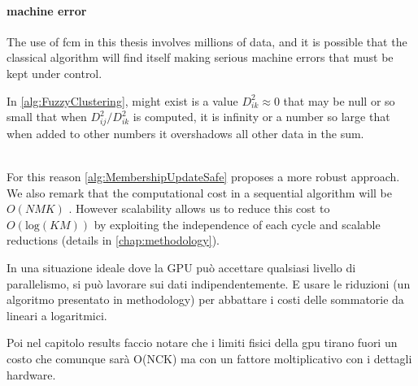 \paragraph{machine error}
The use of \gls{fcm} in this thesis involves millions of data, and it is possible that the classical algorithm will find itself making serious machine errors that must be kept under control. \begin{modified} In \cref{alg:FuzzyClustering}, might exist is a value $D_{ik}^2 \approx 0$  that may be null or so small that when $D_{ij}^2 / D_{ik}^2$ is computed, it is infinity or a number so large that when added to other numbers it overshadows all other data in the sum.\end{modified}\\ For this reason \cref{alg:MembershipUpdateSafe} proposes a more robust approach. We also remark that the computational cost in a sequential algorithm will be $O(NMK)$ . However scalability allows us to reduce this cost to $O(\text{log}(KM))$ by exploiting the independence of each cycle and scalable reductions (details in \cref{chap:methodology}).\\
\begin{note}
	In una situazione ideale dove la GPU può accettare qualsiasi livello di parallelismo, si può  lavorare sui dati indipendentemente. E usare le riduzioni (un algoritmo presentato in methodology) per abbattare i costi delle sommatorie da lineari a logaritmici.

	Poi nel capitolo results faccio notare che i limiti fisici della gpu tirano fuori un costo che comunque sarà O(NCK) ma con un fattore moltiplicativo con i dettagli hardware.
\end{note}


